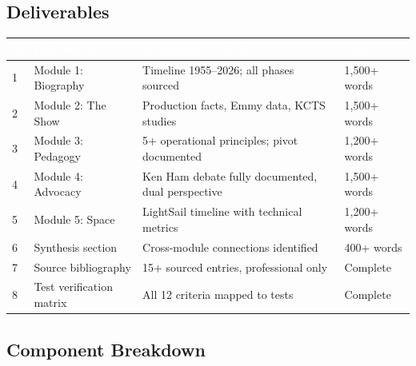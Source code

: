 \documentclass[11pt,letterpaper]{article}
\newcommand{\tableheader}[1]{\textbf{\sffamily\textcolor{white}{#1}}}
\begin{document}
\subsection{Deliverables}

\begin{center}
\begin{tabularx}{\textwidth}{C{0.5cm}L{3.5cm}XC{2cm}}
\toprule
{}
\tableheader{\#} & \tableheader{Deliverable} & \tableheader{Acceptance Criteria} & \tableheader{Spec} \\
 & Module 1: Biography & Timeline 1955--2026; all phases sourced & 1,500+ words \\
2 & Module 2: The Show & Production facts, Emmy data, KCTS studies & 1,500+ words \\
3 & Module 3: Pedagogy & 5+ operational principles; pivot documented & 1,200+ words \\
4 & Module 4: Advocacy & Ken Ham debate fully documented, dual perspective & 1,500+ words \\
5 & Module 5: Space & LightSail timeline with technical metrics & 1,200+ words \\
6 & Synthesis section & Cross-module connections identified & 400+ words \\
7 & Source bibliography & 15+ sourced entries, professional only & Complete \\
8 & Test verification matrix & All 12 criteria mapped to tests & Complete \\
\bottomrule
\end{tabularx}
\end{center}

\subsection{Component Breakdown}
\end{document}
